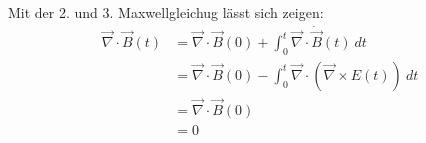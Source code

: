 \documentclass[11pt a4paper]{article}
\newcommand{\diver}{\vec \nabla \cdot}
\newcommand{\rot}{\vec \nabla \times}
\begin{document}
Mit der 2. und 3. Maxwellgleichug lässt sich zeigen:
\begin{align*}
	\diver \vec B(t) 
	&= \diver \vec B(0) + \int_0^t \diver \dot{\vec B}(t) \ dt \\
	&= \diver \vec B(0) - \int_0^t \diver \left( \rot E(t) \right) \ dt \\
	&= \diver \vec B(0) \\
	&= 0
\end{align*}
\end{document}
